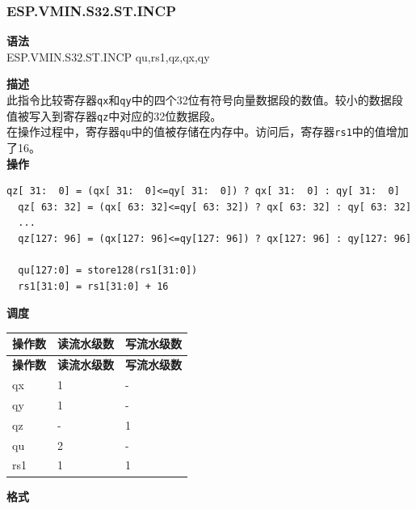 \newpage

\newpage
\subsubsection{ESP.VMIN.S32.ST.INCP}\label{instruction:ESPVMINS32STINCP}
\textbf{语法}\\
ESP.VMIN.S32.ST.INCP qu,rs1,qz,qx,qy

\textbf{描述}\\
此指令比较寄存器\lstinline{qx}和\lstinline{qy}中的四个32位有符号向量数据段的数值。较小的数据段值被写入到寄存器\lstinline{qz}中对应的32位数据段。\\在操作过程中，寄存器\lstinline{qu}中的值被存储在内存中。访问后，寄存器\lstinline{rs1}中的值增加了16。\\
\textbf{操作}
\begin{lstlisting}[escapeinside=`?]
  qz[ 31:  0] = (qx[ 31:  0]<=qy[ 31:  0]) ? qx[ 31:  0] : qy[ 31:  0]
  qz[ 63: 32] = (qx[ 63: 32]<=qy[ 63: 32]) ? qx[ 63: 32] : qy[ 63: 32]
  ...
  qz[127: 96] = (qx[127: 96]<=qy[127: 96]) ? qx[127: 96] : qy[127: 96]

  qu[127:0] = store128(rs1[31:0])
  rs1[31:0] = rs1[31:0] + 16
\end{lstlisting}


\textbf{调度}\\
\begin{longtable}[c]{|l|l|l|}
    \hline
    \rowcolor{lightgray}
    \textbf{操作数} & \textbf{读流水级数} & \textbf{写流水级数} \\\hline
    \endfirsthead
    \hline
    \rowcolor{lightgray}
     \textbf{操作数} & \textbf{读流水级数} & \textbf{写流水级数} \\\hline
    \endhead
    \hline
    \endfoot

    qx & 1 & - \\\hline
  qy & 1 & - \\\hline
     qz & - & 1 \\\hline
     qu & 2 & - \\\hline
     rs1 & 1 & 1

\end{longtable}

\textbf{格式}\\


